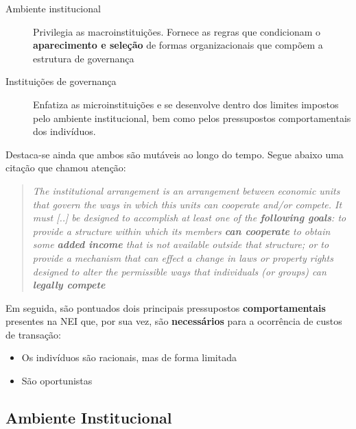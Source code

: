 \documentclass[9pt,twocolumn,twoside,lineno]{style}
\begin{document}
\begin{description}
	\item[Ambiente institucional] Privilegia as macroinstituições. Fornece as regras que condicionam o \textbf{aparecimento e seleção} de formas organizacionais que compõem a estrutura de governança
	\item[Instituições de governança] Enfatiza as microinstituições e se desenvolve dentro dos limites impostos pelo ambiente institucional, bem como pelos pressupostos comportamentais dos indivíduos.
\end{description}
Destaca-se ainda que ambos são mutáveis ao longo do tempo. Segue abaixo uma citação que chamou atenção:

\begin{quote}
	\textit{The institutional arrangement is an arrangement between
	economic units that govern the ways in wbich this units
	can cooperate and/or compete. It must [..] be designed to
	accomplish at least one of the \textbf{following goals}: to provide a structure within which its members \textbf{can cooperate} to obtain some \textbf{added income} that is not available outside that structure;
	or to provide a mechanism that can effect a change in laws or property rights
	designed to alter the permissible ways that individuals (or groups) can \textbf{legally compete}}
\end{quote}

Em seguida, são pontuados dois principais pressupostos \textbf{comportamentais} presentes na NEI que, por sua vez, são \textbf{necessários} para a ocorrência de custos de transação:

\begin{itemize}
	\item Os indivíduos são racionais, mas de forma limitada
	\item São oportunistas
\end{itemize}

\subsection{Ambiente Institucional}
\end{document}
